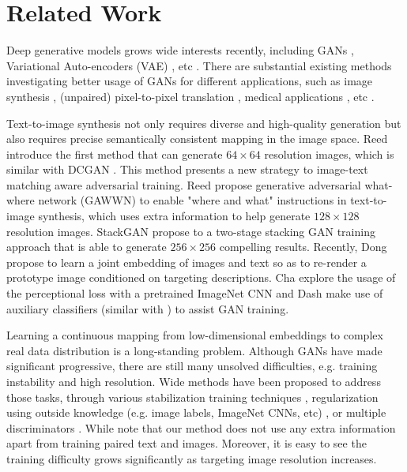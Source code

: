 \documentclass[10pt,twocolumn,letterpaper]{article}
\begin{document}
\section{Related Work}
Deep generative models grows wide interests recently, including GANs \cite{goodfellow2014generative}, Variational Auto-encoders (VAE) \cite{kingma2013auto}, etc \cite{oord2016pixel}. 
There are substantial existing methods investigating better usage of GANs for different applications, such as image synthesis \cite{radford2015unsupervised, shrivastava2016learning}, (unpaired) pixel-to-pixel translation \cite{isola2016image,zhu2017unpaired},  medical applications \cite{costa2017towards}, etc \cite{ledig2016photo,huang2016stacked}.

Text-to-image synthesis not only requires diverse and high-quality generation but also requires precise semantically consistent mapping in the image space.  Reed \etal \cite{reed2016generative} introduce the first method that can generate $64{\times}64$ resolution images, which is similar with DCGAN \cite{radford2015unsupervised}. This method presents a new strategy to image-text matching aware adversarial training. Reed \etal \cite{reed2016learning} propose generative
adversarial what-where network (GAWWN) to enable "where and what" instructions in text-to-image synthesis, which uses extra information to help generate $128{\times}128$ resolution images. StackGAN \etal \cite{han2017stackgan} propose to a two-stage stacking GAN training approach that is able to generate $256{\times}256$ compelling results. Recently, Dong \etal \cite{dong2017semantic} propose to learn a joint embedding of images and text so as to re-render a prototype image conditioned on targeting descriptions. Cha \etal \cite{char2017perceptual} explore the usage of the perceptional loss with a pretrained ImageNet CNN \cite{johnson2016perceptual} and Dash \etal \cite{dash2017tac} make use of auxiliary classifiers (similar with \cite{odena2016conditional}) to assist GAN training. 
	
Learning a continuous mapping from low-dimensional embeddings to complex real data distribution is a long-standing problem. Although GANs have made significant progressive, there are still many  unsolved difficulties, e.g. training instability and high resolution. Wide methods have been proposed to address those tasks, through various stabilization training techniques \cite{salimans2016improved,arjovsky2017wasserstein,berthelot2017began,shrivastava2016learning,odena2016conditional}, regularization using outside knowledge (e.g. image labels, ImageNet CNNs, etc) \cite{dosovitskiy2016generating,ledig2016photo,dash2017tac,dash2017tac}, or multiple discriminators  \cite{metz2016unrolled,durugkar2016generative,yang2017lr}. While note that our method does not use any extra information apart from training paired text and images. Moreover, it is easy to see the training difficulty grows significantly as targeting image resolution increases.
\end{document}
